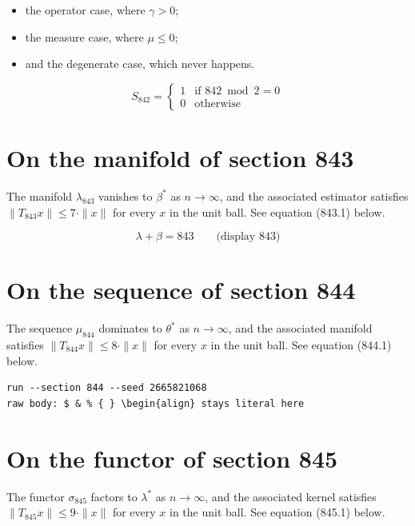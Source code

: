 \documentclass{article}
\begin{document}
\begin{itemize}
  \item the operator case, where $\gamma > 0$;
  \item the measure case, where $\mu \leq 0$;
  \item and the degenerate case, which never happens.
\end{itemize}

\begin{equation}
S_{842} = \begin{cases} 1 & \text{if } 842 \bmod 2 = 0 \\ 0 & \text{otherwise} \end{cases}
\end{equation}

\section{On the manifold of section 843}
The manifold $\lambda_{843}$ vanishes to $\beta^{*}$ as $n \to \infty$,
and the associated estimator satisfies $\|T_{843} x\| \leq 7 \cdot \|x\|$
for every $x$ in the unit ball. See equation (843.1) below.

$$
\lambda + \beta = 843 \qquad \text{(display 843)}
$$

\section{On the sequence of section 844}
The sequence $\mu_{844}$ dominates to $\theta^{*}$ as $n \to \infty$,
and the associated manifold satisfies $\|T_{844} x\| \leq 8 \cdot \|x\|$
for every $x$ in the unit ball. See equation (844.1) below.

\begin{verbatim}
run --section 844 --seed 2665821068
raw body: $ & % { } \begin{align} stays literal here
\end{verbatim}

\section{On the functor of section 845}
The functor $\sigma_{845}$ factors to $\lambda^{*}$ as $n \to \infty$,
and the associated kernel satisfies $\|T_{845} x\| \leq 9 \cdot \|x\|$
for every $x$ in the unit ball. See equation (845.1) below.
\end{document}
